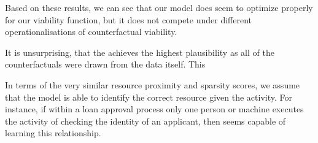 \documentclass[./../../paper.tex]{subfiles}
\begin{document}
Based on these results, we can see that our model does seem  to optimize properly for our viability function, but it does not compete under different operationalisations of counterfactual viability. 

It is unsurprising, that the \ModelCBG achieves the highest plausibility as all of the counterfactuals were drawn from the data itself. This

In terms of the very similar resource proximity and sparsity scores, we assume that the model is able to identify the correct resource given the activity. For instance, if within a loan approval process only one person or machine executes the activity of checking the identity of an applicant, then \ModelEVOFSR seems capable of learning this relationship.  
\end{document}
